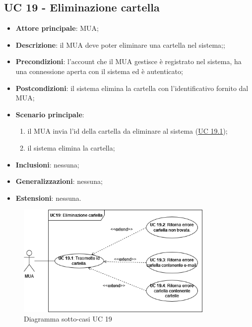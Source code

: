 \subsection{UC 19 - Eliminazione cartella} \label{sec:UC19}
    \begin{itemize}
        \item \textbf{Attore principale}: MUA;
        \item \textbf{Descrizione}: il MUA deve poter eliminare una cartella nel sistema;;
        \item \textbf{Precondizioni}: l’account che il MUA gestisce è registrato nel sistema, ha una connessione aperta con il sistema ed è autenticato;
        \item \textbf{Postcondizioni}: il sistema elimina la cartella con l'identificativo fornito dal MUA;
        \item \textbf{Scenario principale}:
            \begin{enumerate}
                \item il MUA invia l'id della cartella da eliminare al sistema (\hyperref[sec:UC19.1]{UC 19.1});
                \item il sistema elimina la cartella;
            \end{enumerate}
        \item \textbf{Inclusioni}: nessuna;
        \item \textbf{Generalizzazioni}: nessuna;
        \item \textbf{Estensioni}: nessuna.
    \end{itemize}

\begin{figure}[h]
    \includegraphics[width=0.85\textwidth]{sections/uc_imgs/UC19.png}
    \centering
    \caption{Diagramma sotto-casi UC 19}
\end{figure}

